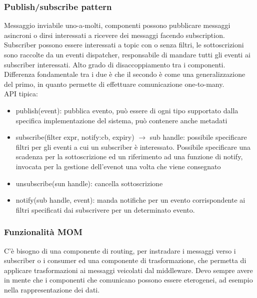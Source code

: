 \documentclass[16px]{article}
\begin{document}
\subsubsection{Publish/subscribe pattern}
Messaggio inviabile uno-a-molti, componenti possono pubblicare messaggi asincroni o dirsi interessati a ricevere dei messaggi facendo subscription.\\ Subscriber possono essere interessati a topic con o senza filtri, le sottoscrizioni sono raccolte da un eventi dispatcher, responsabile di mandare tutti gli eventi ai subscriber interessati. Alto grado di disaccoppiamento tra i componenti. Differenza fondamentale tra i due è che il secondo è come una generalizzazione del primo, in quanto permette di effettuare comunicazione one-to-many.\\ API tipica:
\begin{itemize}
\item publish(event): pubblica evento, può essere di ogni tipo supportato dalla specifica implementazione del sistema, può contenere anche metadati
\item subscribe(filter expr, notify:cb, expiry) $\rightarrow$ sub handle: possibile specificare filtri per gli eventi a cui un subscriber è interessato. Possibile specificare una scadenza per la sottoscrizione ed un riferimento ad una funzione di notify, invocata per la gestione dell'evenot una volta che viene consegnato
\item unsubscribe(sun handle): cancella sottoscrizione
\item notify(sub handle, event): manda notifiche per un evento corrispondente ai filtri specificati dai subscrivere per un determinato evento. 
\end{itemize}
\subsubsection{Funzionalità MOM}
C'è bisogno di una componente di routing, per instradare i messaggi verso i subscriber o i consumer ed una componente di trasformazione, che permetta di applicare trasformazioni ai messaggi veicolati dal middleware. Devo sempre avere in mente che i componenti che comunicano possono essere eterogenei, ad esempio nella rappresentazione dei dati.
\end{document}
